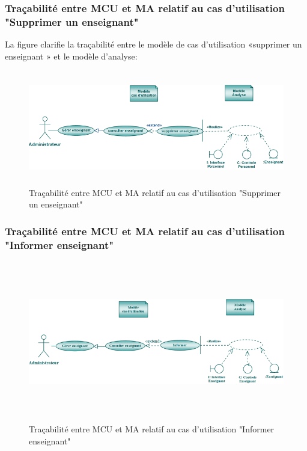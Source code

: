 \documentclass[12 pt ]{report}
\begin{document}
\subsubsection{Traçabilité entre MCU et MA relatif au cas d’utilisation "Supprimer un enseignant" }
La figure  clarifie la traçabilité entre le modèle de cas d’utilisation «supprimer un enseignant » et le modèle
d’analyse:
\begin{figure}[h]
\begin{center}
\includegraphics[width= 13cm , height =5cm]{sup_ens.png}
\caption{Traçabilité entre MCU et MA relatif au cas d’utilisation "Supprimer un enseignant"}
\end{center}
\end{figure} 
\subsubsection{Traçabilité entre MCU et MA relatif au cas d’utilisation "Informer enseignant" }
\begin{figure}[h]
\begin{center}
\includegraphics[width= 14cm , height =7cm]{tra_info_ens.png}
\caption{Traçabilité entre MCU et MA relatif au cas d’utilisation "Informer enseignant"}
\end{center}
\end{figure}
\end{document}
